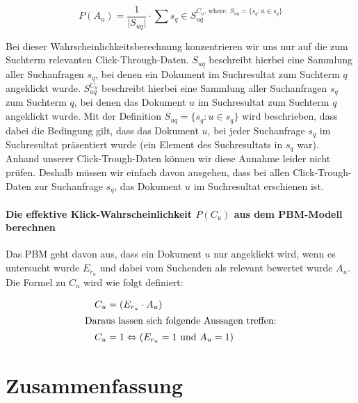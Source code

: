 \vspace{-1.5em}
\begin{equation}	
	P(A_{u}) = \frac{1}{\vert S_{uq} \vert} \cdot \sum{s_q \in S_{uq}^{C_{u}\text{, where, } S_{uq} = \lbrace s_q : u \in s_q \rbrace}}
\end{equation}
\vspace{-1em}

Bei dieser Wahrscheinlichkeitsberechnung konzentrieren wir uns nur auf die zum Suchterm relevanten Click-Through-Daten. $S_{uq}$ beschreibt hierbei eine Sammlung aller Suchanfragen $s_q$, bei denen ein Dokument im Suchresultat zum Suchterm $q$ angeklickt wurde. $S_{uq}^{C_{u}}$ beschreibt hierbei eine Sammlung aller Suchanfragen $s_q$ zum Suchterm $q$, bei denen das Dokument $u$ im Suchresultat zum Suchterm $q$ angeklickt wurde. Mit der Definition $S_{uq} = \lbrace s_q : u \in s_q \rbrace$ wird beschrieben, dass dabei die Bedingung gilt, dass das Dokument $u$, bei jeder Suchanfrage $s_q$ im Suchresultat präsentiert wurde (ein Element des Suchresultats in $s_q$ war). Anhand unserer Click-Trough-Daten können wir diese Annahme leider nicht prüfen. Deshalb müssen wir einfach davon ausgehen, dass bei allen Click-Trough-Daten zur Suchanfrage $s_q$, das Dokument $u$ im Suchresultat erschienen ist. 

\paragraph{Die effektive Klick-Wahrscheinlichkeit $P(C_{u})$ aus dem PBM-Modell berechnen}
Das PBM geht davon aus, dass ein Dokument $u$ nur angeklickt wird, wenn es untersucht wurde $E_{r_{u}}$ und dabei vom Suchenden als relevant bewertet wurde $A_{u}$. Die Formel zu $C_{u}$ wird wie folgt definiert:

\vspace{-2em}
\begin{spacing}{.75}
\begin{align}
	&&	C_{u} &= \left(E_{r_{u}} \cdot A_{u}\right) &\\
  \intertext{Daraus lassen sich folgende Aussagen treffen:}
  &&	C_{u} &= 1\Leftrightarrow \left(E_{r_{u}} = 1 \text{ und } A_{u} = 1\right)
\end{align}
\end{spacing}
\vspace{-1em}


\section{Zusammenfassung}
\label{sec:Grundlagen:Zusammenfassung}

